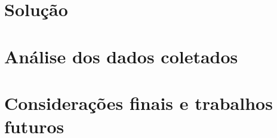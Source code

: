 \documentclass[ecp,tc]{iiufrgs}
\begin{document}
\chapter{Solução}
\label{chap:soluction}


\chapter{Análise dos dados coletados}
\label{chap:results}


\chapter{Considerações finais e trabalhos futuros}
\label{chap:conclusion}


%

%



\end{document}
